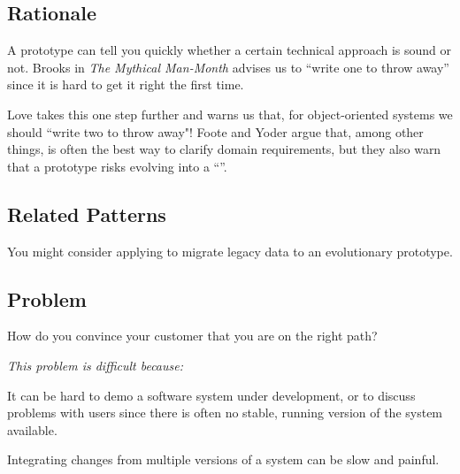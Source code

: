 \documentclass[a4paper,10pt,twoside]{book}
\begin{document}
\subsection*{Rationale}

A prototype can tell you quickly whether a certain technical approach is sound or not. Brooks in \emph{The Mythical Man-Month} \cite{Broo75a} advises us to ``write one to throw away'' since it is hard to get it right the first time.

Love \cite{Love93a} takes this one step further and warns us that, for object-oriented systems we should ``write two to throw away"! Foote and Yoder \cite{Foot00a} argue that, among other things,  is often the best way to clarify domain requirements, but they also warn that a prototype risks evolving into a ``''.

\subsection*{Related Patterns}

You might consider applying  to migrate legacy data to an evolutionary prototype.




\subsection*{Problem}

How do you convince your customer that you are on the right path?

\emph{This problem is difficult because:} 

\begin{bulletlist}
\item It can be hard to demo a software system under development, or to discuss problems with users since there is often no stable, running version of the system available.

\item Integrating changes from multiple versions of a system can be slow and painful.
\end{bulletlist}
\end{document}
